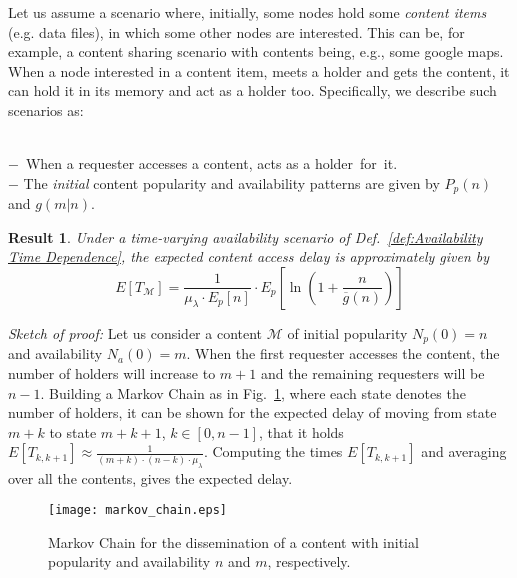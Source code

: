 \documentclass[journal]{IEEEtran}
\newtheorem{result}{Result}
\begin{document}
Let us assume a scenario where, initially, some nodes hold some \textit{content items} (e.g. data files), in which some other nodes are interested. This can be, for example, a content sharing scenario with contents being, e.g., some google maps. When a node interested in a content item, meets a holder and gets the content, it can hold it in its memory and act as a holder too. Specifically, we describe such scenarios as:


\begin{definition}\label{def:Availability Time Dependence}~\\
$-$~When a requester accesses a content, acts as a holder~for~it.\\
$-$ The \emph{initial} content popularity and availability patterns are given by $P_{p}(n)$ and $g(m|n)$.
\end{definition}

\begin{result}\label{R:ATD}
Under a time-varying availability scenario of Def.~\ref{def:Availability Time Dependence}, the expected content access delay is approximately given by
\begin{equation}
E[T_{\mathcal{M}}]=\frac{1}{\mu_{\lambda}\cdot E_{p}[n]}\cdot E_{p}\left[\ln\left(1+\frac{n}{\overline{g}(n)}\right)\right]\nonumber
\end{equation}
\end{result}
\textit{Sketch of proof:} Let us consider a content $\mathcal{M}$ of initial popularity $N_{p}(0)=n$ and availability $N_{a}(0)=m$. When the first requester accesses the content, the number of holders will increase to $m+1$ and the remaining requesters will be $n-1$. Building a Markov Chain as in Fig.~\ref{fig:markov-chain}, where each state denotes the number of holders, it can be shown for the expected delay of moving from state $m+k$ to state $m+k+1$, $k\in[0,n-1]$, that it holds $E[T_{k,k+1}] \approx \frac{1}{(m+k)\cdot (n-k)\cdot \mu_{\lambda}} $. Computing the times $E[T_{k,k+1}]$ and averaging over all the contents, gives the expected delay.
\begin{figure}
\centering
\texttt{[image: markov\_chain.eps]}
\caption{Markov Chain for the dissemination of a content with initial popularity and availability $n$ and $m$, respectively.}
\label{fig:markov-chain}
\end{figure}
\end{document}

